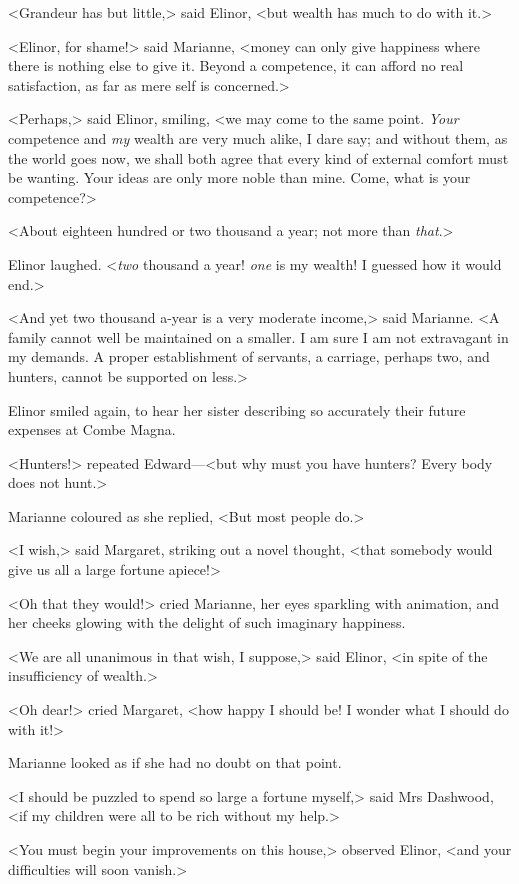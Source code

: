 <Grandeur has but little,> said Elinor, <but wealth has much to do with it.>

<Elinor, for shame!> said Marianne, <money can only give happiness where there is nothing else to give it. Beyond a competence, it can afford no real satisfaction, as far as mere self is concerned.>

<Perhaps,> said Elinor, smiling, <we may come to the same point. \textit{Your} competence and \textit{my} wealth are very much alike, I dare say; and without them, as the world goes now, we shall both agree that every kind of external comfort must be wanting. Your ideas are only more noble than mine. Come, what is your competence?>

<About eighteen hundred or two thousand a year; not more than \textit{that}.>

Elinor laughed. <\textit{two} thousand a year! \textit{one} is my wealth! I guessed how it would end.>

<And yet two thousand a-year is a very moderate income,> said Marianne. <A family cannot well be maintained on a smaller. I am sure I am not extravagant in my demands. A proper establishment of servants, a carriage, perhaps two, and hunters, cannot be supported on less.>

Elinor smiled again, to hear her sister describing so accurately their future expenses at Combe Magna.

<Hunters!> repeated Edward—<but why must you have hunters? Every body does not hunt.>

Marianne coloured as she replied, <But most people do.>

<I wish,> said Margaret, striking out a novel thought, <that somebody would give us all a large fortune apiece!>

<Oh that they would!> cried Marianne, her eyes sparkling with animation, and her cheeks glowing with the delight of such imaginary happiness.

<We are all unanimous in that wish, I suppose,> said Elinor, <in spite of the insufficiency of wealth.>

<Oh dear!> cried Margaret, <how happy I should be! I wonder what I should do with it!>

Marianne looked as if she had no doubt on that point.

<I should be puzzled to spend so large a fortune myself,> said Mrs Dashwood, <if my children were all to be rich without my help.>

<You must begin your improvements on this house,> observed Elinor, <and your difficulties will soon vanish.>

